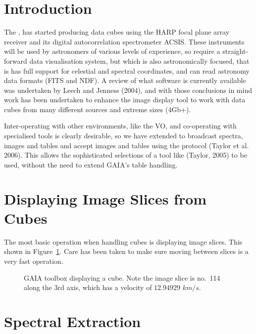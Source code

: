 \documentclass[11pt,twoside]{article}  %
\begin{document}
\section{Introduction}

The , has started
producing data cubes using the HARP focal plane array receiver and its digital
autocorrelation spectrometer ACSIS. These instruments will be used by
astronomers of various levels of experience, so require a straight-forward
data visualisation system, but which is also astronomically focused, that is
has full support for celestial and spectral coordinates, and can read
astronomy data formats (FITS and NDF). A review of what software is currently
available was undertaken by Leech and Jenness (2004), and with those
conclusions in mind work has been undertaken to enhance the 
image display tool to work with data cubes from many different sources and
extreme sizes (4Gb+).

Inter-operating with other environments, like the VO, and co-operating with
specialised tools is clearly desirable, so we have extended 
to broadcast spectra, images and tables and accept images and tables using the
protocol (Taylor et al. 2006). This allows the sophisticated selections of a
tool like
(Taylor, 2005) to be used, without the need to extend GAIA's
table handling.

\section{Displaying Image Slices from Cubes}

The most basic operation when handling cubes is displaying image slices. This
shown in Figure~\ref{D1.1-fig1}. Care has been taken to make sure moving
between slices is a very fast operation.

\begin{figure}
\caption{GAIA toolbox displaying a cube. Note the image slice is no.\ 114
along the 3rd axis, which has a velocity of $12.94929$ $km/s$.
}
\label{D1.1-fig1}
\end{figure}

\section{Spectral Extraction}
\end{document}
